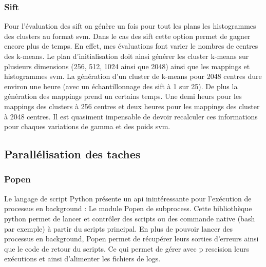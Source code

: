 \documentclass[a4paper, 11pt]{article}
\begin{document}
\subsubsection{Sift}

Pour l'évaluation des sift on génère un fois pour tout les plans les histogrammes des clusters au format svm. Dans le cas des sift cette option permet de gagner encore plus de temps. En effet, mes évaluations font varier le nombres de centres des k-means. Le plan d'initialisation doit ainsi générer les cluster k-means sur plusieurs dimensions (256, 512, 1024 ainsi que 2048) ainsi que les mappings et histogrammes svm. La génération d'un cluster de k-means pour 2048 centres dure environ une heure (avec un échantillonnage des sift à 1 sur 25). De plus la génération des mappings prend un certains temps. Une demi heurs pour les mappings des clusters à 256 centres et deux heures pour les mappings des cluster à 2048 centres.
Il est quasiment impensable de devoir recalculer ces informations pour chaques variations de gamma et des poids svm.

\subsection{Parallélisation des taches}

\subsubsection{Popen}
Le langage de script Python présente un api inintéressante pour l'exécution de processus en background : Le module Popen de subprocess. Cette bibliothèque python permet de lancer et contrôler des scripts ou des commande native (bash par exemple) à partir du scripts principal. En plus de pouvoir lancer des processus en background, Popen permet de récupérer leurs sorties d'erreurs ainsi que le code de retour du scripts. Ce qui permet de gérer avec p rescision leurs exécutions et ainsi d'alimenter les fichiers de logs.
\end{document}
